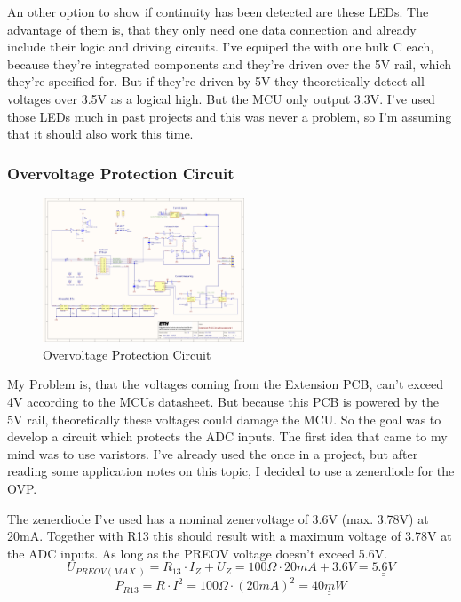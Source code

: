 An other option to show if continuity has been detected are these LEDs. The advantage of them is, that they only need one data connection and already include their logic and driving circuits. I've equiped the with one bulk C each, because they're integrated components and they're driven over the 5V rail, which they're specified for. But if they're driven by 5V they theoretically detect all voltages over 3.5V as a logical high. But the MCU only output 3.3V. I've used those LEDs much in past projects and this was never a problem, so I'm assuming that it should also work this time.



\subsubsection{Overvoltage Protection Circuit}

\begin{figure}[H]
	\centering
	\includegraphics[width=6cm, trim={17cm 9.5cm 19cm 15.5cm}, clip]{../../../5_Hardware/PCB_EXTENSION_CircuitVoyager_pre1/Project Outputs for PCB_EXT_CV_PRE1/Schematic_PCB_EXTENSION_CircuitVoyager_pre1.pdf}
	\caption{Overvoltage Protection Circuit}
	\label{fig:Overvoltage Protection Circuit}
\end{figure}

My Problem is, that the voltages coming from  the Extension PCB, can't exceed 4V according to the MCUs datasheet. But because this PCB is powered by the 5V rail, theoretically these voltages could damage the MCU. So the goal was to develop a circuit which protects the ADC inputs. The first idea that came to my mind was to use varistors. I've already used the once in a project, but after reading some application notes on this topic, I decided to use a zenerdiode for the OVP. \cite{Protecting_ADC_Inputs_AN}

The zenerdiode I've used has a nominal zenervoltage of 3.6V (max. 3.78V) at 20mA. Together with R13 this should result with a maximum voltage of 3.78V at the ADC inputs. As long as the PREOV voltage doesn't exceed 5.6V.
\[U_{PREOV(MAX.)} = R_{13} \cdot I_Z + U_Z = 100\Omega \cdot 20mA + 3.6V = \underline{\underline{5.6V}}\]
\[P_{R13} = R \cdot I^2 = 100\Omega \cdot (20mA)^2 = \underline{\underline{40mW}}\]


